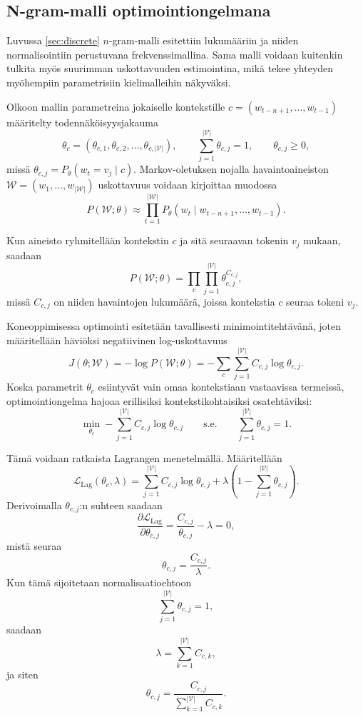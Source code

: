 \subsection{N-gram-malli optimointiongelmana}

Luvussa \ref{sec:discrete} \(n\)-gram-malli esitettiin lukumääriin ja niiden
normalisointiin perustuvana frekvenssimallina. Sama malli voidaan kuitenkin
tulkita myös suurimman uskottavuuden estimointina, mikä tekee yhteyden
myöhempiin parametrisiin kielimalleihin näkyväksi.

Olkoon mallin parametreina jokaiselle kontekstille
\(c = (w_{t-n+1}, \ldots, w_{t-1})\) määritelty todennäköisyysjakauma
\[
  \theta_c = (\theta_{c,1}, \theta_{c,2}, \ldots, \theta_{c,|\mathcal{V}|}),
  \qquad
  \sum_{j=1}^{|\mathcal{V}|} \theta_{c,j} = 1,
  \qquad
  \theta_{c,j} \ge 0,
\]
missä \(\theta_{c,j} = P_\theta(w_t = v_j \mid c)\). Markov-oletuksen nojalla havaintoaineiston
\(\mathcal{W} = (w_1, \ldots, w_{|\mathcal{W}|})\) uskottavuus voidaan kirjoittaa muodossa
\[
  P(\mathcal{W};\theta)
  \approx
  \prod_{t=1}^{|\mathcal{W}|}
  P_\theta(w_t \mid w_{t-n+1}, \ldots, w_{t-1}).
\]

Kun aineisto ryhmitellään kontekstin \(c\) ja sitä seuraavan tokenin \(v_j\)
mukaan, saadaan
\[
  P(\mathcal{W};\theta)
  =
  \prod_c \prod_{j=1}^{|\mathcal{V}|}
  \theta_{c,j}^{C_{c,j}},
\]
missä \(C_{c,j}\) on niiden havaintojen lukumäärä, joissa kontekstia \(c\)
seuraa tokeni \(v_j\).

Koneoppimisessa optimointi esitetään tavallisesti minimointitehtävänä, joten
määritellään häviöksi negatiivinen log-uskottavuus
\[
  J(\theta;\mathcal{W})
  =
  -\log P(\mathcal{W};\theta)
  =
  -\sum_c \sum_{j=1}^{|\mathcal{V}|}
  C_{c,j} \log \theta_{c,j}.
\]
Koska parametrit \(\theta_c\) esiintyvät vain omaa
kontekstiaan vastaavissa termeissä, optimointiongelma hajoaa erillisiksi
kontekstikohtaisiksi osatehtäviksi:
\[
  \min_{\theta_c}
  -\sum_{j=1}^{|\mathcal{V}|} C_{c,j} \log \theta_{c,j}
  \qquad
  \text{s.e.}
  \qquad
  \sum_{j=1}^{|\mathcal{V}|}\theta_{c,j} = 1.
\]

Tämä voidaan ratkaista Lagrangen menetelmällä. Määritellään
\[
  \mathcal{L}_{\mathrm{Lag}}(\theta_c,\lambda)
  =
  \sum_{j=1}^{|\mathcal{V}|}
  C_{c,j}\log \theta_{c,j}
  +
  \lambda\left(1-\sum_{j=1}^{|\mathcal{V}|}\theta_{c,j}\right).
\]
Derivoimalla \(\theta_{c,j}\):n suhteen saadaan
\[
  \frac{\partial \mathcal{L}_{\mathrm{Lag}}}{\partial \theta_{c,j}}
  =
  \frac{C_{c,j}}{\theta_{c,j}} - \lambda = 0,
\]
mistä seuraa
\[
  \theta_{c,j} = \frac{C_{c,j}}{\lambda}.
\]
Kun tämä sijoitetaan normalisaatioehtoon
\[
  \sum_{j=1}^{|\mathcal{V}|}\theta_{c,j} = 1,
\]
saadaan
\[
  \lambda = \sum_{k=1}^{|\mathcal{V}|} C_{c,k},
\]
ja siten
\[
  \theta_{c,j}
  =
  \frac{C_{c,j}}{\sum_{k=1}^{|\mathcal{V}|} C_{c,k}}.
\]

